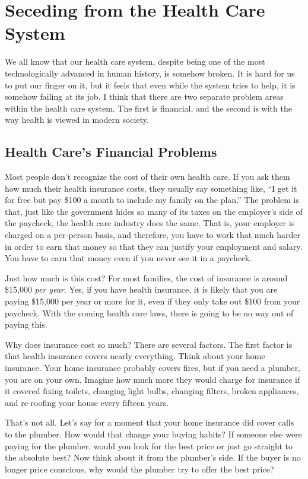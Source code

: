 \chapter{Seceding from the Health Care System}

We all know that our health care system, despite being one of the most
technologically advanced in human history, is somehow broken. It is
hard for us to put our finger on it, but it feels that even while
the system tries to
help, it is somehow failing at its job. I think that there are two
separate problem areas within the health care system. The first is
financial, and the second is with the way health is viewed in modern
society.

\section{Health Care’s Financial Problems}

Most people don’t recognize the cost of their own health care. If you
ask them how much their health insurance costs, they usually say
something like, ``I get it for free but pay \$100 a month to include my
family on the plan.''  The problem is that, just like the government
hides so many of its taxes on the employer’s side of the paycheck, the
health care industry does the same. That is, your employer is charged
on a per-person basis, and therefore, you have to work that much harder
in order to earn that money so that they can
justify your employment and salary. You have to earn that money even if
you never see it in a paycheck.

Just how much is this cost?  For most families, the cost of insurance is
around \$15,000 \textit{per year}. Yes, if you have health insurance,
it is likely that you are paying \$15,000 per year or more for it, even
if they only take out \$100 from your paycheck. With the coming
health care laws, there is going to be no way out of paying this.

Why does insurance cost so much?  There are several
factors. The first factor is that health insurance covers nearly everything. Think about
your home insurance. Your home insurance probably covers fires, but if
you need a plumber, you are on your own. Imagine how much more they
would charge for
insurance if it covered fixing toilets, changing light bulbs, changing
filters, broken appliances, and re-roofing your house every fifteen
years. 

That’s not all. Let’s say for a moment that your home insurance did
cover calls to the plumber. How would that change your buying habits? 
If someone else were paying for the plumber, would you look for the
best price or just go straight to the absolute best?  Now think about it
from the plumber’s side. If the buyer is no longer price conscious, why
would the plumber try to offer the best price? 

